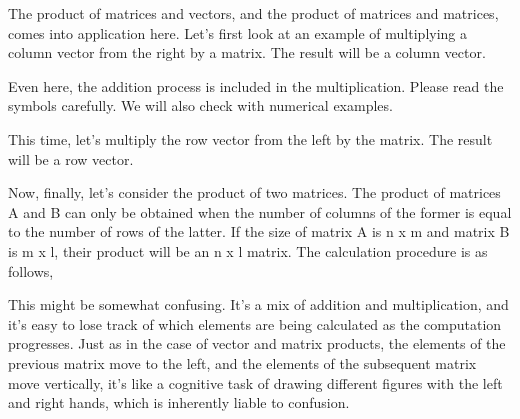 \documentclass{ltjsbook}
\begin{document}




The product of matrices and vectors, and the product of matrices and matrices, comes into application here.
Let's first look at an example of multiplying a column vector from the right by a matrix. The result will be a column vector.




Even here, the addition process is included in the multiplication. Please read the symbols carefully. We will also check with numerical examples.




This time, let's multiply the row vector from the left by the matrix. The result will be a row vector.






Now, finally, let's consider the product of two matrices. The product of matrices A and B can only be obtained when the number of columns of the former is equal to the number of rows of the latter. If the size of matrix A is n x m and matrix B is m x l, their product will be an n x l matrix. The calculation procedure is as follows,



This might be somewhat confusing. It's a mix of addition and multiplication, and it's easy to lose track of which elements are being calculated as the computation progresses. Just as in the case of vector and matrix products, the elements of the previous matrix move to the left, and the elements of the subsequent matrix move vertically, it's like a cognitive task of drawing different figures with the left and right hands, which is inherently liable to confusion.
\end{document}
